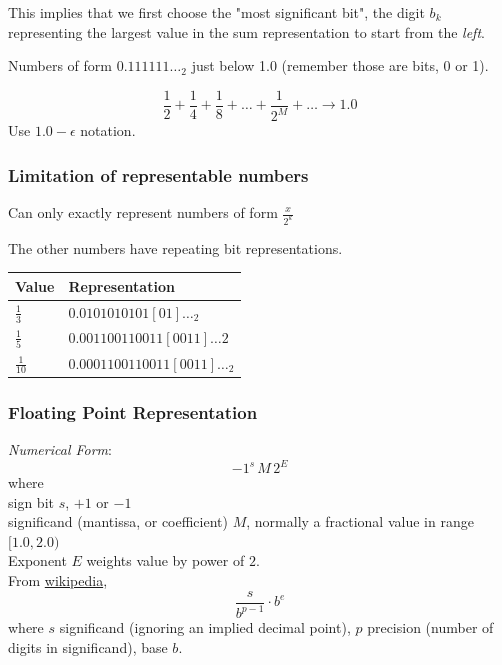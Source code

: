 \documentclass[10pt]{amsart}
\begin{document}
\begin{multicols*}{2}
This implies that we first choose the "most significant bit", the digit $b_k$ representing the largest value in the sum representation to start from the \emph{left}.

Numbers of form $0.111111\dots_2$ just below 1.0 (remember those are bits, 0 or 1).

\[
\frac{1}{2} + \frac{1}{4} + \frac{1}{8} + \dots + \frac{1}{2^{M}} + \dots \to 1.0
\]
Use $1.0 - \epsilon$ notation.

\subsubsection{Limitation of representable numbers}

Can only exactly represent numbers of form $\frac{x}{2^k}$

The other numbers have repeating bit representations.

\begin{center}
	\begin{tabular}{ l | l }
		\hline
		Value & Representation \\ \hline
		$\frac{1}{3}$ & $0.0101010101[01]\dots_2$ \\ 
		$\frac{1}{5}$ & $0.001100110011[0011] \dots 2$ \\
		$\frac{1}{10}$ & $0.0001100110011[0011] \dots_2$ \\
		\hline
	\end{tabular}
\end{center}

\subsubsection{Floating Point Representation}

\emph{Numerical Form}: 
\begin{equation}
-1^s \, M \, 2^E
\end{equation}
where \\

sign bit $s$, $+1$ or $-1$ \\
significand (mantissa, or coefficient) $M$, normally a fractional value in range $[1.0, 2.0)$ \\
Exponent $E$ weights value by power of $2$. \\

From \href{https://en.wikipedia.org/wiki/Floating-point_arithmetic}{wikipedia}, 
\begin{equation}\label{Eqn:FloatingPointRepresentationExplicit}
\frac{s}{b^{p-1}} \cdot b^e
\end{equation}
where $s$ significand (ignoring an implied decimal point), $p$ precision (number of digits in significand), base $b$.


\end{multicols*}
\end{document}
